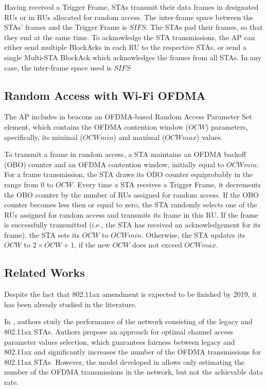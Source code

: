 Having received a Trigger Frame, STAs transmit their data frames in designated RUs or in RUs allocated for random access.
The inter-frame space between the STAs' frames and the Trigger Frame is $SIFS$.
The STAs pad their frames, so that they end at the same time.
To acknowledge the STA transmissions, the AP can either send multiple BlockAcks in each RU to the respective STAs, or send a single Multi-STA BlockAck which acknowledges the frames from all STAs.
In any case, the inter-frame space used is $SIFS$




\subsection{Random Access with Wi-Fi OFDMA}
The AP includes in beacons an OFDMA-based Random Access Parameter Set element, which contains the OFDMA contention window ($OCW$) parameters, specifically, its minimal ($OCWmin$) and maximal ($OCWmax$) values.

To transmit a frame in random access, a STA maintains an OFDMA backoff (OBO) counter and an OFDMA contention window, initially equal to $OCWmin$.
For a frame transmission, the STA draws its OBO counter equiprobably in the range from $0$ to $OCW$.
Every time a STA receives a Trigger Frame, it decrements the OBO counter by the number of RUs assigned for random access.
If the OBO counter becomes less then or equal to zero, the STA randomly selects one of the RUs assigned for random access and transmits its frame in this RU.
If the frame is successfully transmitted (i.e., the STA has received an acknowledgement for its frame), the STA sets its $OCW$ to $OCWmin$.
Otherwise, the STA updates its $OCW$ to $2 \times OCW + 1$, if the new $OCW$ does not exceed $OCWmax$.


\subsection{Related Works}

Despite the fact that 802.11ax amendment is expected to be finished by 2019, it has been already studied in the literature\cite{ bellalta2016ieee, khorov2016several, karaca2016resource, ofdma-par1, ofdma-par2}.

In \cite{khorov2016several}, authors study the performance of the network consisting of the legacy and 802.11ax STAs.
Authors propose an approach for optimal channel access parameter values selection, which guarantees fairness between legacy and 802.11ax and significantly increases the number of the OFDMA transmissions for 802.11ax STAs.
However, the model developed in \cite{khorov2016several} allows only estimating the number of the OFDMA transmissions in the network, but not the achievable data rate.

